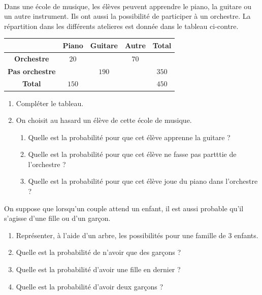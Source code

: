 \documentclass[11pt]{article}
\begin{document}
\begin{exo}~\\
  \begin{minipage}[]{.4\textwidth}
    Dans une école de musique, les élèves peuvent apprendre le piano, la guitare
    ou un autre instrument. Ils ont aussi la possibilité de participer à un
    orchestre. La répartition dans les différents atelieres est donnée dans le
    tableau ci-contre.
  \end{minipage}
  \begin{minipage}[]{.6\textwidth}
    \begin{center}
\renewcommand{\arraystretch}{1.5}
\begin{tabular}{|c|c|c|c|c|}
  \cline{2-5}
  \multicolumn{1}{c|}{} & \textbf{Piano} & \textbf{Guitare} & \textbf{Autre} &
  \textbf{Total} \\
  \hline
  \textbf{Orchestre} & $20$ & & $70$ & \\
  \hline
  \textbf{Pas orchestre} & & $190$ & & $350$ \\
  \hline
  \textbf{Total} & $150$ & & & $450$ \\
  \hline
\end{tabular}
\end{center}
  \end{minipage}
  \begin{enumerate}
    \item Compléter le tableau.
    \item On choisit au hasard un élève de cette école de musique.
      \begin{enumerate}
        \item Quelle est la probabilité pour que cet élève apprenne la guitare ?
        \item Quelle est la probabilité pour que cet élève ne fasse pas partttie
          de l'orchestre ?
        \item Quelle est la probabilité pour que cet élève joue du piano dans
          l'orchestre ?
      \end{enumerate}
  \end{enumerate}
\end{exo}

\begin{exo}
  On suppose que lorsqu'un couple attend un enfant, il est aussi probable qu'il
  s'agisse d'une fille ou d'un garçon.
  \begin{enumerate}
    \item Représenter, à l'aide d'un arbre, les possibilités pour une famille de
      $3$ enfants.
    \item Quelle est la probabilité de n'avoir que des garçons ?
    \item Quelle est la probabilité d'avoir une fille en dernier ?
    \item Quelle est la probabilité d'avoir deux garçons ?
  \end{enumerate}
\end{exo}
\end{document}
